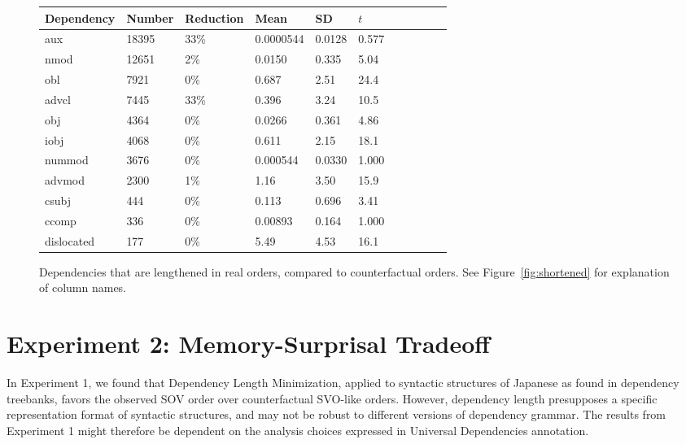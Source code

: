 \documentclass[11pt,a4paper]{article}
\begin{document}
\begin{figure}
\begin{center}
\begin{tabular}{l|llllllllll}
   Dependency  &Number &Reduction     &  Mean   &   SD &       $t$ \\ \hline
  aux      &    18395  &  33\% &  0.0000544  &0.0128 &   0.577 \\
 nmod         &12651  &  2\%&  0.0150     &0.335  &   5.04  \\
 obl          & 7921  &  0\%     &  0.687      &2.51&     24.4   \\
  advcl        & 7445  &  33\% &  0.396      &3.24  &   10.5   \\
 obj          & 4364  &  0\%     &  0.0266     &0.361 &    4.86  \\
 iobj         & 4068  &  0\%    &  0.611      &2.15  &   18.1   \\
 nummod       & 3676  &  0\%     &  0.000544   &0.0330&    1.000 \\
 advmod       & 2300  &  1\%&  1.16       &3.50  &   15.9   \\
 csubj        &  444  &  0\%    &   0.113      &0.696 &    3.41  \\
 ccomp        &  336  &  0\%    &   0.00893    &0.164 &    1.000 \\
 dislocated   &  177  &  0\%    &   5.49       &4.53  &   16.1   \\
\end{tabular}
\end{center}
\caption{Dependencies that are lengthened in real orders, compared to counterfactual orders. See Figure~\ref{fig:shortened} for explanation of column names.}\label{fig:lengthened}
\end{figure}



\section{Experiment 2: Memory-Surprisal Tradeoff}

In Experiment 1, we found that Dependency Length Minimization, applied to syntactic structures of Japanese as found in dependency treebanks, favors the observed SOV order over counterfactual SVO-like orders.
However, dependency length presupposes a specific representation format of syntactic structures, and may not be robust to different versions of dependency grammar.
The results from Experiment 1 might therefore be dependent on the analysis choices expressed in Universal Dependencies annotation.
\end{document}
